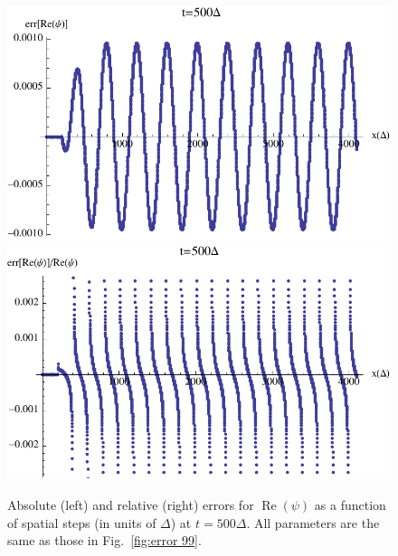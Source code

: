 \documentclass[12pt,letter,onecolumn,notitlepage]{article}
\DeclareMathOperator{\re}{Re}
\begin{document}
\begin{figure}[htbp]%
	\centering
		\includegraphics[scale=0.6]{abs_error_t_500}
		\includegraphics[scale=0.6]{rel_error_t_500}
		\caption{Absolute (left) and relative (right) errors for $\re(\psi)$ as a function of spatial steps (in units of $\Delta$) at $t=500\Delta$. All parameters are the same as those in Fig.~\ref{fig:error 99}.}
		\label{fig:error 500}
\end{figure}
\end{document}
